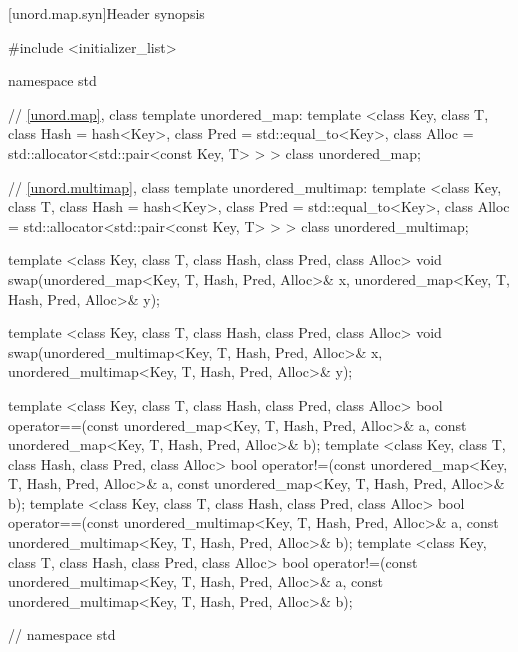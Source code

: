[unord.map.syn]{Header  synopsis}%
%
%
%
\begin{codeblock}
#include <initializer_list>

namespace std {

  // \ref{unord.map}, class template unordered_map:
  template <class Key,
            class T,
            class Hash = hash<Key>,
            class Pred = std::equal_to<Key>,
            class Alloc = std::allocator<std::pair<const Key, T> > >
    class unordered_map;

  // \ref{unord.multimap}, class template unordered_multimap:
  template <class Key,
            class T,
            class Hash = hash<Key>,
            class Pred = std::equal_to<Key>,
            class Alloc = std::allocator<std::pair<const Key, T> > >
    class unordered_multimap;

  template <class Key, class T, class Hash, class Pred, class Alloc>
    void swap(unordered_map<Key, T, Hash, Pred, Alloc>& x,
              unordered_map<Key, T, Hash, Pred, Alloc>& y);

  template <class Key, class T, class Hash, class Pred, class Alloc>
    void swap(unordered_multimap<Key, T, Hash, Pred, Alloc>& x,
              unordered_multimap<Key, T, Hash, Pred, Alloc>& y);

  template <class Key, class T, class Hash, class Pred, class Alloc>
    bool operator==(const unordered_map<Key, T, Hash, Pred, Alloc>& a,
                    const unordered_map<Key, T, Hash, Pred, Alloc>& b);
  template <class Key, class T, class Hash, class Pred, class Alloc>
    bool operator!=(const unordered_map<Key, T, Hash, Pred, Alloc>& a,
                    const unordered_map<Key, T, Hash, Pred, Alloc>& b);
  template <class Key, class T, class Hash, class Pred, class Alloc>
    bool operator==(const unordered_multimap<Key, T, Hash, Pred, Alloc>& a,
                    const unordered_multimap<Key, T, Hash, Pred, Alloc>& b);
  template <class Key, class T, class Hash, class Pred, class Alloc>
    bool operator!=(const unordered_multimap<Key, T, Hash, Pred, Alloc>& a,
                    const unordered_multimap<Key, T, Hash, Pred, Alloc>& b);
} // namespace std
\end{codeblock}

